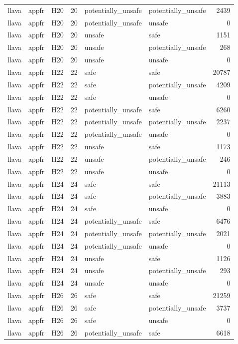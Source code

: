 \begin{table}[tbp]
\begin{tabular}{lllrllr}
llava & appfr & H20 & 20 & potentially\_unsafe & potentially\_unsafe & 2439 \\
llava & appfr & H20 & 20 & potentially\_unsafe & unsafe & 0 \\
llava & appfr & H20 & 20 & unsafe & safe & 1151 \\
llava & appfr & H20 & 20 & unsafe & potentially\_unsafe & 268 \\
llava & appfr & H20 & 20 & unsafe & unsafe & 0 \\
llava & appfr & H22 & 22 & safe & safe & 20787 \\
llava & appfr & H22 & 22 & safe & potentially\_unsafe & 4209 \\
llava & appfr & H22 & 22 & safe & unsafe & 0 \\
llava & appfr & H22 & 22 & potentially\_unsafe & safe & 6260 \\
llava & appfr & H22 & 22 & potentially\_unsafe & potentially\_unsafe & 2237 \\
llava & appfr & H22 & 22 & potentially\_unsafe & unsafe & 0 \\
llava & appfr & H22 & 22 & unsafe & safe & 1173 \\
llava & appfr & H22 & 22 & unsafe & potentially\_unsafe & 246 \\
llava & appfr & H22 & 22 & unsafe & unsafe & 0 \\
llava & appfr & H24 & 24 & safe & safe & 21113 \\
llava & appfr & H24 & 24 & safe & potentially\_unsafe & 3883 \\
llava & appfr & H24 & 24 & safe & unsafe & 0 \\
llava & appfr & H24 & 24 & potentially\_unsafe & safe & 6476 \\
llava & appfr & H24 & 24 & potentially\_unsafe & potentially\_unsafe & 2021 \\
llava & appfr & H24 & 24 & potentially\_unsafe & unsafe & 0 \\
llava & appfr & H24 & 24 & unsafe & safe & 1126 \\
llava & appfr & H24 & 24 & unsafe & potentially\_unsafe & 293 \\
llava & appfr & H24 & 24 & unsafe & unsafe & 0 \\
llava & appfr & H26 & 26 & safe & safe & 21259 \\
llava & appfr & H26 & 26 & safe & potentially\_unsafe & 3737 \\
llava & appfr & H26 & 26 & safe & unsafe & 0 \\
llava & appfr & H26 & 26 & potentially\_unsafe & safe & 6618 \\

\end{tabular}
\end{table}
